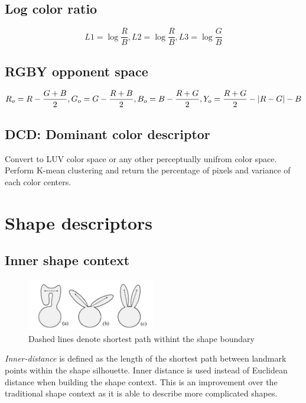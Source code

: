 \documentclass[hyp]{socreport}
\DeclarePairedDelimiter{\abs}{\lvert}{\rvert}
\begin{document}
\subsection{Log color ratio}

\[
  L1 = \log{\frac{R}{B}}, L2 = \log{\frac{R}{B}}, L3 = \log{\frac{G}{B}}
\]

\subsection{RGBY opponent space}

\[
  R_o = R - \frac{G + B}{2}, G_o = G - \frac{R + B}{2}, B_o = B - \frac{R +
    G}{2}, Y_o = \frac{R + G}{2} - \abs{R - G} - B
\]

\subsection{DCD: Dominant color descriptor}

Convert to LUV color space or any other perceptually unifrom color space.
Perform K-mean clustering and return the percentage of pixels and variance of
each color centers.

\section{Shape descriptors}
\label{sec:shape_descriptors}

\subsection{Inner shape context}

\begin{figure}[H]
\centering
  \includegraphics[width=0.5\textwidth, height=0.1\textheight]{innerdistance.png}
  \caption{Dashed lines denote shortest path withint the shape boundary}
  \label{fig:inner_shapecontext}
\end{figure}

\textit{Inner-distance} is defined as the length of the shortest path between
landmark points within the shape silhouette. Inner distance is used instead of
Euclidean distance when building the shape context. This is an improvement over
the traditional shape context as it is able to describe more complicated shapes.
\end{document}

